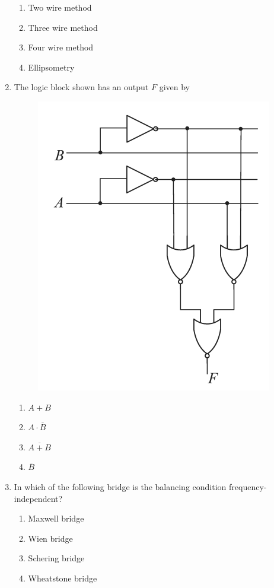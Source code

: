 \documentclass[journal,12pt,onecolumn]{IEEEtran}
\theoremstyle{remark}
\begin{document}
\begin{enumerate}
\hfill{}
\begin{enumerate}
\item Two wire method
\item Three wire method
\item Four wire method
\item Ellipsometry
\end{enumerate}

\item The logic block shown has an output $F$ given by \underline{\hspace{2cm}}

\hfill{}
\begin{figure}[H]
\includegraphics[width = 0.5\columnwidth]{q21}
\caption*{}
\label{q21}
\end{figure}
\begin{enumerate}
\item $A + B$
\item $A \cdot \overline{B}$
\item $\overline{A + B}$
\item $\overline{B}$
\end{enumerate}

\item In which of the following bridge is the balancing condition frequency-independent?

\hfill{}
\begin{enumerate}
\item Maxwell bridge
\item Wien bridge
\item Schering bridge
\item Wheatstone bridge
\end{enumerate}


\end{enumerate}
\end{document}
